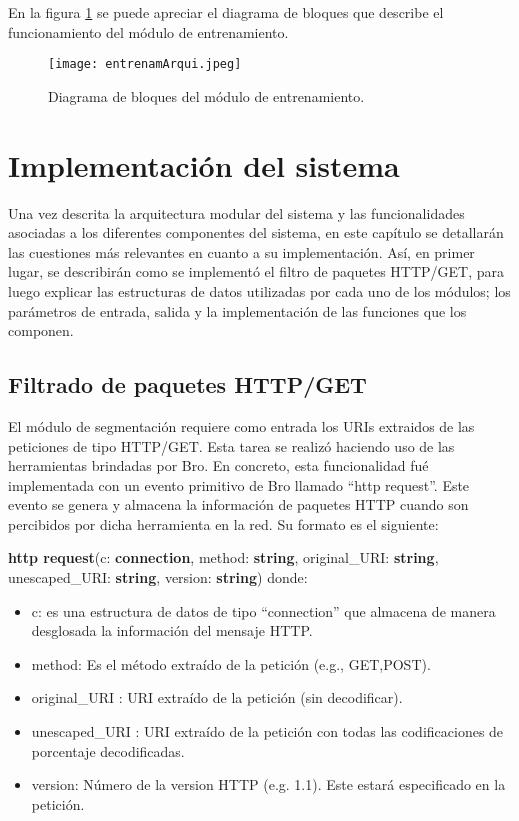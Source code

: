 En la figura \ref{fig:arquiEntrenamiento} se puede apreciar el diagrama de bloques que describe el funcionamiento del módulo de entrenamiento.

\begin{figure}[tb]
\begin{center}
\texttt{[image: entrenamArqui.jpeg]}
\caption{Diagrama de bloques del módulo de entrenamiento.}
\label{fig:arquiEntrenamiento}
\end{center}
\end{figure}

\section{Implementación del sistema}

Una vez descrita la arquitectura modular del sistema y las funcionalidades asociadas a los diferentes componentes del sistema, en este capítulo se detallarán las cuestiones más relevantes en cuanto a su implementación.
Así, en primer lugar, se describirán como se implementó el filtro de paquetes HTTP/GET, para luego explicar las estructuras de datos utilizadas por cada uno de los módulos; los parámetros de entrada, salida y la implementación de las funciones que los componen.

\subsection{Filtrado de paquetes HTTP/GET}

El módulo de segmentación requiere como entrada los URIs extraidos de las peticiones de tipo HTTP/GET. Esta tarea se realizó haciendo uso de las herramientas brindadas por Bro. En concreto, esta funcionalidad fué implementada con un evento primitivo de Bro llamado ``http request''. Este evento se genera y almacena la información de paquetes HTTP cuando son percibidos por dicha herramienta en la red. Su formato es el siguiente:

\textbf{http request}(c: \textbf{connection}, method: \textbf{string}, original\_URI: \textbf{string},
unescaped\_URI: \textbf{string}, version: \textbf{string})
donde:
\begin{itemize}
\item c: es una estructura de datos de tipo ``connection'' que almacena de manera desglosada la información del mensaje HTTP.
\item method: Es el método extraído de la petición (e.g., GET,POST).
\item original\_URI : URI extraído de la petición (sin decodificar).
\item unescaped\_URI : URI extraído de la petición con todas las codificaciones de porcentaje decodificadas.
\item version: Número de la version HTTP (e.g. 1.1). Este estará especificado en la petición.
\end{itemize}

